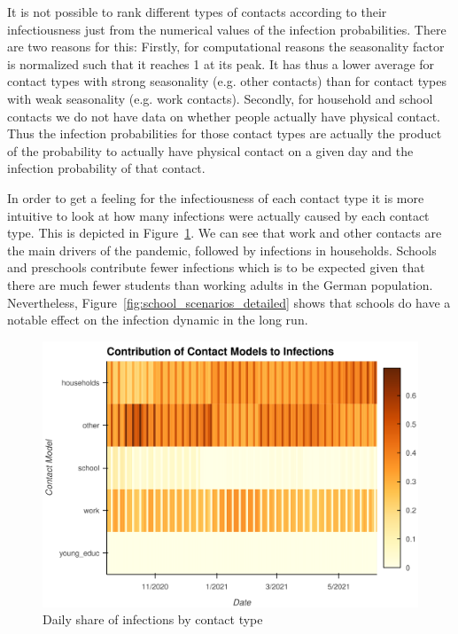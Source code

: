 It is not possible to rank different types of contacts according to their
infectiousness just from the numerical values of the infection probabilities.
There are two reasons for this: Firstly, for computational reasons the
seasonality factor is normalized such that it reaches 1 at its peak. It has thus
a lower average for contact types with strong seasonality (e.g. other contacts) than for
contact types with weak seasonality (e.g. work contacts). Secondly, for household and
school contacts we do not have data on whether people actually have physical contact.
Thus the infection probabilities for those contact types are actually the product of the
probability to actually have physical contact on a given day and the infection
probability of that contact.

In order to get a feeling for the infectiousness of each contact type it
is more intuitive to look at how many infections were actually caused by each contact
type. This is depicted in Figure~\ref{fig:infection_heatmap}. We can see that work and
other contacts are the main drivers of the pandemic, followed by infections in
households. Schools and preschools contribute fewer infections which is to be expected
given that there are much fewer students than working adults in the German population.
Nevertheless, Figure~\ref{fig:school_scenarios_detailed} shows that schools do have a
notable effect on the infection dynamic in the long run.

\begin{figure}
    \centering
    \includegraphics[width=\textwidth]{figures/infection_channels.png}
    \caption{Daily share of infections by contact type}
    \label{fig:infection_heatmap}
\end{figure}

